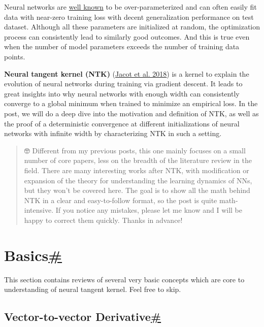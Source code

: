 Neural networks are \href{https://lilianweng.github.io/posts/2019-03-14-overfit/}{well known} to be over-parameterized and can often easily fit data with near-zero training loss with decent generalization performance on test dataset. Although all these parameters are initialized at random, the optimization process can consistently lead to similarly good outcomes. And this is true even when the number of model parameters exceeds the number of training data points.

\textbf{Neural tangent kernel (NTK)} (\href{https://arxiv.org/abs/1806.07572}{Jacot et al. 2018}) is a kernel to explain the evolution of neural networks during training via gradient descent. It leads to great insights into why neural networks with enough width can consistently converge to a global minimum when trained to minimize an empirical loss. In the post, we will do a deep dive into the motivation and definition of NTK, as well as the proof of a deterministic convergence at different initializations of neural networks with infinite width by characterizing NTK in such a setting.

\begin{quote}
🤓 Different from my previous posts, this one mainly focuses on a small number of core papers, less on the breadth of the literature review in the field. There are many interesting works after NTK, with modification or expansion of the theory for understanding the learning dynamics of NNs, but they won't be covered here. The goal is to show all the math behind NTK in a clear and easy-to-follow format, so the post is quite math-intensive. If you notice any mistakes, please let me know and I will be happy to correct them quickly. Thanks in advance!
\end{quote}

\section{\texorpdfstring{Basics\hyperref[basics]{\#}}{Basics\#}}\label{basics}

This section contains reviews of several very basic concepts which are core to understanding of neural tangent kernel. Feel free to skip.

\subsection{\texorpdfstring{Vector-to-vector Derivative\hyperref[vector-to-vector-derivative]{\#}}{Vector-to-vector Derivative\#}}\label{vector-to-vector-derivative}


